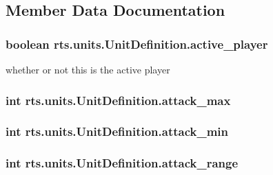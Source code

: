 \subsection{Member Data Documentation}
\hypertarget{classrts_1_1units_1_1_unit_definition_a19733b35d9f65bd6e4f725d6780be34c}{
\subsubsection[{active\_\-player}]{\setlength{\rightskip}{0pt plus 5cm}boolean {\bf rts.units.UnitDefinition.active\_\-player}}}
\label{classrts_1_1units_1_1_unit_definition_a19733b35d9f65bd6e4f725d6780be34c}
whether or not this is the active player \hypertarget{classrts_1_1units_1_1_unit_definition_a3435285522cf3943dcef94aba404eba7}{
\subsubsection[{attack\_\-max}]{\setlength{\rightskip}{0pt plus 5cm}int {\bf rts.units.UnitDefinition.attack\_\-max}}}
\label{classrts_1_1units_1_1_unit_definition_a3435285522cf3943dcef94aba404eba7}
\hypertarget{classrts_1_1units_1_1_unit_definition_a35c3e9d08e32aa6554de76e3c7d22b7a}{
\subsubsection[{attack\_\-min}]{\setlength{\rightskip}{0pt plus 5cm}int {\bf rts.units.UnitDefinition.attack\_\-min}}}
\label{classrts_1_1units_1_1_unit_definition_a35c3e9d08e32aa6554de76e3c7d22b7a}
\hypertarget{classrts_1_1units_1_1_unit_definition_a10e9d5f6303b4163258104d1bb8288f4}{
\subsubsection[{attack\_\-range}]{\setlength{\rightskip}{0pt plus 5cm}int {\bf rts.units.UnitDefinition.attack\_\-range}}}
